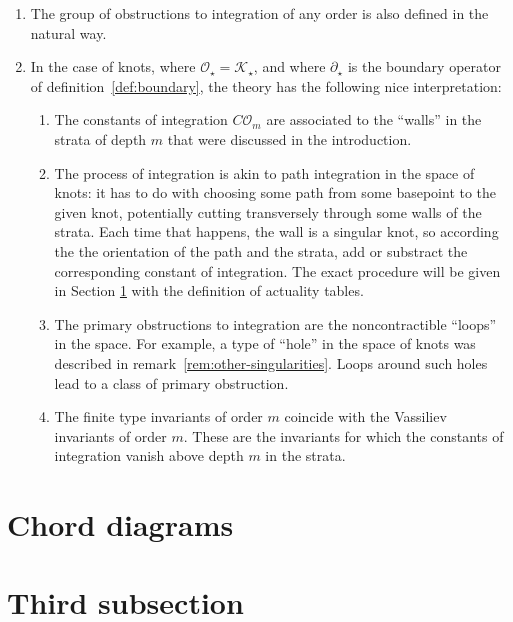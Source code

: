 \begin{remarks}
	\begin{enumerate}
		\item The group of obstructions to integration of any order is also defined in the natural way.

		\item In the case of knots, where \(\mathcal{O}_{\star} = \mathcal{K}_{\star}\), and where \(\partial_{\star}\) is the boundary operator of definition~\ref{def:boundary}, the theory has the following nice interpretation:

			\begin{enumerate}
				\item The constants of integration \(C\mathcal{O}_{m}\) are associated to the ``walls'' in the strata of depth \(m\) that were discussed in the introduction.

				\item The process of integration is akin to path integration in the space of knots: it has to do with choosing some path from some basepoint to the given knot, potentially cutting transversely through some walls of the strata. Each time that happens, the wall is a singular knot, so according the the orientation of the path and the strata, add or substract the corresponding constant of integration. The exact procedure will be given in Section \ref{sec:chord-diagrams} with the definition of actuality tables.

				\item The primary obstructions to integration are the noncontractible ``loops'' in the space. For example, a type of ``hole'' in the space of knots was described in remark~\ref{rem:other-singularities}. Loops around such holes lead to a class of primary obstruction.

				\item The finite type invariants of order \(m\) coincide with the Vassiliev invariants of order \(m\). These are the invariants for which the constants of integration vanish above depth \(m\) in the strata.

			\end{enumerate}
	\end{enumerate}
\end{remarks}


\section{Chord diagrams}
\label{sec:chord-diagrams}



\section{Third subsection}
